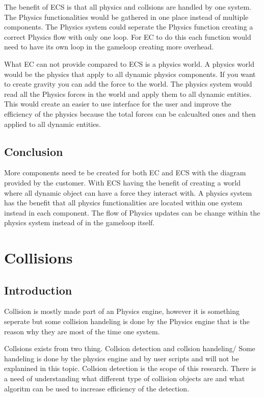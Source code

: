 \documentclass{projdoc}
\begin{document}
The benefit of ECS is that all physics and collsions are handled by one system. The
Physics functionalities would be gathered in one place instead of multiple
components. The Physics system could seperate the Physics function creating a correct
Physics flow with only one loop. For EC to do this each function would need to have
its own loop in the gameloop creating more overhead.

What EC can not provide compared to ECS is a physics world. A physics world would be
the physics that apply to all dynamic physics components. If you want to create
gravity you can add the force to the world. The physics system would read all the
Physics forces in the world and apply them to all dynamic entities. This would create
an easier to use interface for the user and improve the efficiency of the physics
because the total forces can be calcualted ones and then applied to all dynamic
entities.

\subsection{Conclusion}

More components need te be created for both EC and ECS with the diagram provided by
the customer. With ECS having the benefit of creating a world where all dynamic
object can have a force they interact with. A physics system has the benefit that all
physics functionalities are located within one system instead in each component. The
flow of Physics updates can be change within the physics system instead of in the
gameloop itself.

\section{Collisions}

\subsection{Introduction}

Collision is mostly made part of an Physics engine, however it is something seperate
but some collision handeling is done by the Physics engine that is the reason why
they are most of the time one system.

Collsions exists from two thing. Collsion detection and collsion handeling/ Some
handeling is done by the physics engine and by user scripts and will not be
explanined in this topic. Collsion detection is the scope of this research. There is
a need of understanding what different type of collision objects are and what
algoritm can be used to increase efficiency of the detection.
\end{document}
